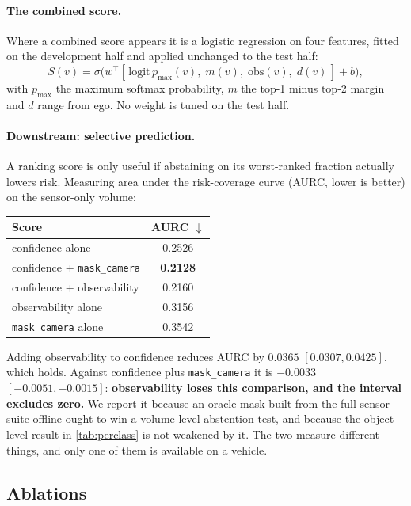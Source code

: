 \documentclass[10pt,twocolumn,letterpaper]{article}
\begin{document}
\paragraph{The combined score.}
Where a combined score appears it is a logistic regression on four features,
fitted on the development half and applied unchanged to the test half:
\begin{equation}
S(v) = \sigma\!\big(w^{\!\top}
  [\,\mathrm{logit}\,p_{\max}(v),\; m(v),\; \mathrm{obs}(v),\; d(v)\,] + b\big),
\label{eq:combined}
\end{equation}
with $p_{\max}$ the maximum softmax probability, $m$ the top-1 minus top-2
margin and $d$ range from ego. No weight is tuned on the test half.

\paragraph{Downstream: selective prediction.}
A ranking score is only useful if abstaining on its worst-ranked fraction
actually lowers risk. Measuring area under the risk-coverage curve
(AURC, lower is better) on the sensor-only volume:
\begin{center}\small
\begin{tabular}{lc}
\toprule
Score & AURC $\downarrow$ \\
\midrule
confidence alone                & 0.2526 \\
confidence + \texttt{mask\_camera} & \textbf{0.2128} \\
confidence + observability      & 0.2160 \\
observability alone             & 0.3156 \\
\texttt{mask\_camera} alone     & 0.3542 \\
\bottomrule
\end{tabular}
\end{center}
Adding observability to confidence reduces AURC by
$0.0365$ $[0.0307, 0.0425]$, which holds. Against
confidence plus \texttt{mask\_camera} it is $-0.0033$
$[-0.0051, -0.0015]$: \textbf{observability loses this comparison, and the
interval excludes zero.} We report it because an oracle mask built from the
full sensor suite offline ought to win a volume-level abstention test, and
because the object-level result in \cref{tab:perclass} is not weakened by
it. The two measure different things, and only one of them is available on
a vehicle.

\subsection{Ablations}
\label{sec:ablations}

\end{document}
